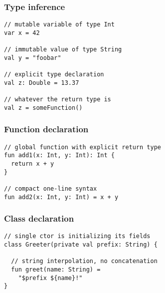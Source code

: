 

\begin{frame}[fragile] \frametitle{Type inference}
\begin{lstlisting}
// mutable variable of type Int
var x = 42

// immutable value of type String
val y = "foobar"

// explicit type declaration
val z: Double = 13.37

// whatever the return type is
val z = someFunction()
\end{lstlisting}
\end{frame}


\begin{frame}[fragile] \frametitle{Function declaration}
\begin{lstlisting}
// global function with explicit return type
fun add1(x: Int, y: Int): Int {
  return x + y
}

// compact one-line syntax
fun add2(x: Int, y: Int) = x + y
\end{lstlisting}
\end{frame}


\begin{frame}[fragile] \frametitle{Class declaration}
\begin{lstlisting}
// single ctor is initializing its fields
class Greeter(private val prefix: String) {

  // string interpolation, no concatenation
  fun greet(name: String) =
    "$prefix ${name}!"
}
\end{lstlisting}
\end{frame}


